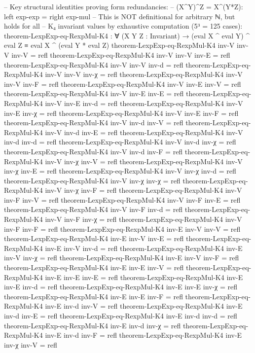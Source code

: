 \documentclass[11pt,a4paper]{article}
\begin{document}
\begin{code}
-- Key structural identities proving form redundancies:
-- (X^Y)^Z = X^(Y*Z): left exp-exp = right exp-mul
-- This is NOT definitional for arbitrary ℕ, but holds for all
-- K₄ invariant values by exhaustive computation (5³ = 125 cases):
theorem-LexpExp-eq-RexpMul-K4 : ∀ (X Y Z : Invariant) →
  (eval X ^ eval Y) ^ eval Z ≡ eval X ^ (eval Y * eval Z)
theorem-LexpExp-eq-RexpMul-K4 inv-V inv-V inv-V = refl
theorem-LexpExp-eq-RexpMul-K4 inv-V inv-V inv-E = refl
theorem-LexpExp-eq-RexpMul-K4 inv-V inv-V inv-d = refl
theorem-LexpExp-eq-RexpMul-K4 inv-V inv-V inv-χ = refl
theorem-LexpExp-eq-RexpMul-K4 inv-V inv-V inv-F = refl
theorem-LexpExp-eq-RexpMul-K4 inv-V inv-E inv-V = refl
theorem-LexpExp-eq-RexpMul-K4 inv-V inv-E inv-E = refl
theorem-LexpExp-eq-RexpMul-K4 inv-V inv-E inv-d = refl
theorem-LexpExp-eq-RexpMul-K4 inv-V inv-E inv-χ = refl
theorem-LexpExp-eq-RexpMul-K4 inv-V inv-E inv-F = refl
theorem-LexpExp-eq-RexpMul-K4 inv-V inv-d inv-V = refl
theorem-LexpExp-eq-RexpMul-K4 inv-V inv-d inv-E = refl
theorem-LexpExp-eq-RexpMul-K4 inv-V inv-d inv-d = refl
theorem-LexpExp-eq-RexpMul-K4 inv-V inv-d inv-χ = refl
theorem-LexpExp-eq-RexpMul-K4 inv-V inv-d inv-F = refl
theorem-LexpExp-eq-RexpMul-K4 inv-V inv-χ inv-V = refl
theorem-LexpExp-eq-RexpMul-K4 inv-V inv-χ inv-E = refl
theorem-LexpExp-eq-RexpMul-K4 inv-V inv-χ inv-d = refl
theorem-LexpExp-eq-RexpMul-K4 inv-V inv-χ inv-χ = refl
theorem-LexpExp-eq-RexpMul-K4 inv-V inv-χ inv-F = refl
theorem-LexpExp-eq-RexpMul-K4 inv-V inv-F inv-V = refl
theorem-LexpExp-eq-RexpMul-K4 inv-V inv-F inv-E = refl
theorem-LexpExp-eq-RexpMul-K4 inv-V inv-F inv-d = refl
theorem-LexpExp-eq-RexpMul-K4 inv-V inv-F inv-χ = refl
theorem-LexpExp-eq-RexpMul-K4 inv-V inv-F inv-F = refl
theorem-LexpExp-eq-RexpMul-K4 inv-E inv-V inv-V = refl
theorem-LexpExp-eq-RexpMul-K4 inv-E inv-V inv-E = refl
theorem-LexpExp-eq-RexpMul-K4 inv-E inv-V inv-d = refl
theorem-LexpExp-eq-RexpMul-K4 inv-E inv-V inv-χ = refl
theorem-LexpExp-eq-RexpMul-K4 inv-E inv-V inv-F = refl
theorem-LexpExp-eq-RexpMul-K4 inv-E inv-E inv-V = refl
theorem-LexpExp-eq-RexpMul-K4 inv-E inv-E inv-E = refl
theorem-LexpExp-eq-RexpMul-K4 inv-E inv-E inv-d = refl
theorem-LexpExp-eq-RexpMul-K4 inv-E inv-E inv-χ = refl
theorem-LexpExp-eq-RexpMul-K4 inv-E inv-E inv-F = refl
theorem-LexpExp-eq-RexpMul-K4 inv-E inv-d inv-V = refl
theorem-LexpExp-eq-RexpMul-K4 inv-E inv-d inv-E = refl
theorem-LexpExp-eq-RexpMul-K4 inv-E inv-d inv-d = refl
theorem-LexpExp-eq-RexpMul-K4 inv-E inv-d inv-χ = refl
theorem-LexpExp-eq-RexpMul-K4 inv-E inv-d inv-F = refl
theorem-LexpExp-eq-RexpMul-K4 inv-E inv-χ inv-V = refl

\end{code}
\end{document}
